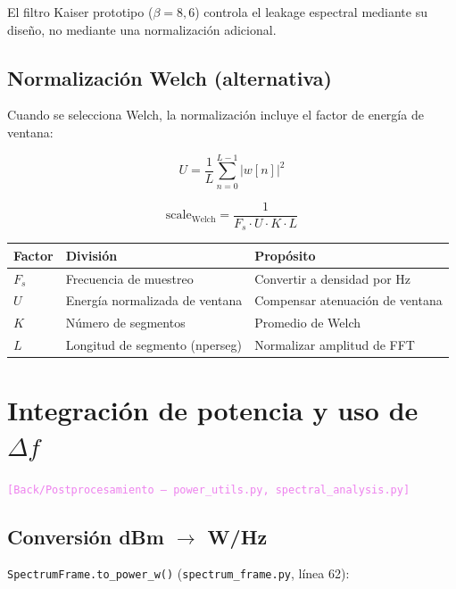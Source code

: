 \documentclass[11pt,a4paper]{article}
\newcommand{\where}[1]{\textcolor{violet}{\texttt{[#1]}}}
\begin{document}
El filtro Kaiser prototipo ($\beta = 8{,}6$) controla el leakage espectral mediante su diseño, no mediante una normalización adicional.

\subsection{Normalización Welch (alternativa)}

Cuando se selecciona Welch, la normalización incluye el factor de energía de ventana:

\begin{equation}
U = \frac{1}{L} \sum_{n=0}^{L-1} |w[n]|^2
\label{eq:u_norm}
\end{equation}

\begin{equation}
\text{scale}_{\text{Welch}} = \frac{1}{F_s \cdot U \cdot K \cdot L}
\label{eq:welch_norm}
\end{equation}

\begin{center}
\begin{tabular}{lll}
\toprule
\textbf{Factor} & \textbf{División} & \textbf{Propósito} \\
\midrule
$F_s$ & Frecuencia de muestreo & Convertir a densidad por Hz \\
$U$ & Energía normalizada de ventana & Compensar atenuación de ventana \\
$K$ & Número de segmentos & Promedio de Welch \\
$L$ & Longitud de segmento (nperseg) & Normalizar amplitud de FFT \\
\bottomrule
\end{tabular}
\end{center}

\section{Integración de potencia y uso de $\Delta f$}
\label{sec:integration}

\where{Back/Postprocesamiento — \texttt{power\_utils.py}, \texttt{spectral\_analysis.py}}

\subsection{Conversión dBm $\to$ W/Hz}

\texttt{SpectrumFrame.to\_power\_w()} (\texttt{spectrum\_frame.py}, línea 62):
\end{document}
